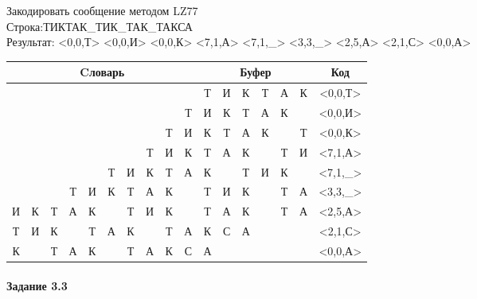 \documentclass[a4paper, 12pt]{article}
\begin{document}
Закодировать сообщение методом LZ77\\
Строка:ТИКТАК\_ТИК\_ТАК\_ТАКСА\\
Результат: <0,0,Т> <0,0,И> <0,0,К> <7,1,А> <7,1,\_> <3,3,\_> <2,5,А> <2,1,С> <0,0,А>\\
\begin{table}[h!]
\centering
\begin{tabular}{|c|c|c|c|c|c|c|c|c|c|c|c|c|c|c|c|c|} 
\hline
\multicolumn{10}{|c|}{Cловарь} & \multicolumn{6}{c|}{Буфер} & Код  \\ \hline
  &   &   &   &   &   &   &   &   &   & \cellcolor[HTML]{8CE4F6} Т & И & К & Т & А & К & <0,0,Т>
\\ \hline
  &   &   &   &   &   &   &   &   & Т & \cellcolor[HTML]{8CE4F6} И & К & Т & А & К &   & <0,0,И>
\\ \hline
  &   &   &   &   &   &   &   & Т & И & \cellcolor[HTML]{8CE4F6} К & Т & А & К &   & Т & <0,0,К>
\\ \hline
  &   &   &   &   &   &   & \cellcolor[HTML]{FFFF00} Т & И & К & \cellcolor[HTML]{FFFF00} Т & \cellcolor[HTML]{8CE4F6} А & К &   & Т & И & <7,1,А>
\\ \hline
  &   &   &   &   & Т & И & \cellcolor[HTML]{FFFF00} К & Т & А & \cellcolor[HTML]{FFFF00} К & \cellcolor[HTML]{8CE4F6}   & Т & И & К &   & <7,1,\_>
\\ \hline
  &   &   & \cellcolor[HTML]{FFFF00} Т & \cellcolor[HTML]{FFFF00} И & \cellcolor[HTML]{FFFF00} К & Т & А & К &   & \cellcolor[HTML]{FFFF00} Т & \cellcolor[HTML]{FFFF00} И & \cellcolor[HTML]{FFFF00} К & \cellcolor[HTML]{8CE4F6}   & Т & А & <3,3,\_>
\\ \hline
И & К & \cellcolor[HTML]{FFFF00} Т & \cellcolor[HTML]{FFFF00} А & \cellcolor[HTML]{FFFF00} К & \cellcolor[HTML]{FFFF00}   & \cellcolor[HTML]{FFFF00} Т & И & К &   & \cellcolor[HTML]{FFFF00} Т & \cellcolor[HTML]{FFFF00} А & \cellcolor[HTML]{FFFF00} К & \cellcolor[HTML]{FFFF00}   & \cellcolor[HTML]{FFFF00} Т & \cellcolor[HTML]{8CE4F6} А & <2,5,А>
\\ \hline
Т & И & \cellcolor[HTML]{FFFF00} К &   & Т & А & К &   & Т & А & \cellcolor[HTML]{FFFF00} К & \cellcolor[HTML]{8CE4F6} С & А &   &   &   & <2,1,С>
\\ \hline
К &   & Т & А & К &   & Т & А & К & С & \cellcolor[HTML]{8CE4F6} А &   &   &   &   &   & <0,0,А>
\\ \hline
\end{tabular}
\end{table}

\paragraph{Задание 3.3}
\end{document}

